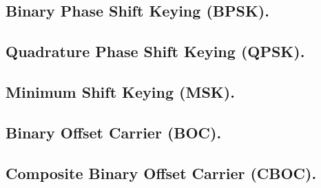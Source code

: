 \subsection*{\fontsize{12}{18}\selectfont Binary Phase Shift Keying (BPSK).}

\begin{justify}
\end{justify}

\subsection*{\fontsize{12}{18}\selectfont Quadrature Phase Shift Keying (QPSK).}

\begin{justify}
\end{justify}

\subsection*{\fontsize{12}{18}\selectfont Minimum Shift Keying (MSK).}

\begin{justify}
\end{justify}

\subsection*{\fontsize{12}{18}\selectfont Binary Offset Carrier (BOC).}

\begin{justify}
\end{justify}

\subsection*{\fontsize{12}{18}\selectfont Composite Binary Offset Carrier (CBOC).}

\begin{justify}
\end{justify}